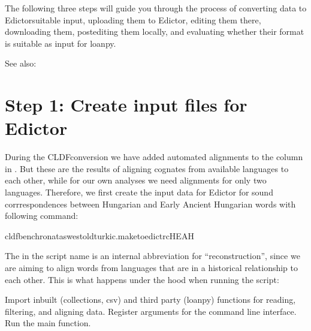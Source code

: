 \documentclass[letterpaper,10pt,english]{sphinxmanual}
\begin{document}
\sphinxAtStartPar
The following three steps will guide you through the process of converting
data to Edictor\sphinxhyphen{}suitable input, uploading them to Edictor, editing them there,
downloading them, post\sphinxhyphen{}editing them locally, and evaluating whether their
format is suitable as input for loanpy.


\begin{sphinxseealso}{See also:}

\sphinxAtStartPar
{}

\sphinxAtStartPar
{}


\end{sphinxseealso}



\section{Step 1: Create input files for Edictor}
\label{\detokenize{mkedictor:step-1-create-input-files-for-edictor}}
\sphinxAtStartPar
During the CLDF\sphinxhyphen{}conversion we have added automated alignments to the column
 in . But these are the results of aligning
cognates from  available languages to each other, while for our own
analyses we need alignments for only two languages. Therefore, we
first create the input data for Edictor for sound corrrespondences between
Hungarian and Early Ancient Hungarian words with following command:

\begin{sphinxVerbatim}[commandchars=\\\{\}]
cldfbenchronataswestoldturkic.maketoedict\PYGZus{}rcHEAH
\end{sphinxVerbatim}

\sphinxAtStartPar
The  in the script name is an internal abbreviation for “reconstruction”,
since we are aiming to align words from languages that are in a historical
relationship to each other. This is what happens under the hood when running
the script:

\label{\detokenize{mkedictor:module-ronataswestoldturkiccommands.maketoedict_rc}}
\sphinxAtStartPar
Import inbuilt (collections, csv) and third party (loanpy)
functions for reading, filtering, and aligning
data. Register arguments for the command line interface.
Run the main function.
\end{document}
